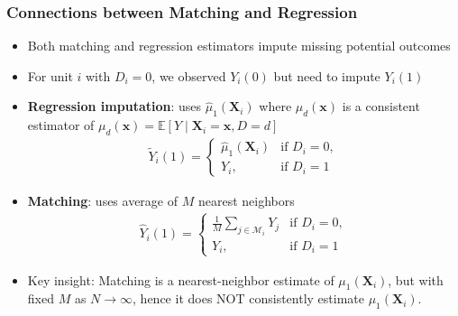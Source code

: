 \documentclass[10pt, handout]{beamer}
\begin{document}
\begin{frame}
  \frametitle{Connections between Matching and Regression}

  \begin{itemize}
    \item Both matching and regression estimators impute missing potential outcomes
    \item For unit $i$ with $D_i = 0$, we observed $Y_i(0)$ but need to impute $Y_i(1)$
    \item \textbf{Regression imputation}: uses $\hat{\mu}_1(\mathbf{X}_i)$ where $\hat{\mu}_d(\mathbf{x})$ is a consistent estimator of $\mu_d(\mathbf{x}) = \mathbb{E}\left[ Y \mid \mathbf{X}_i = \mathbf{x}, D = d \right]$
    \begin{align*}
      \tilde{Y}_i(1) = \begin{cases}
        \hat{\mu}_1(\mathbf{X}_i) & \text{if } D_i = 0, \\
        Y_i, & \text{if } D_i = 1
      \end{cases}
    \end{align*}
    \item \textbf{Matching}: uses average of $M$ nearest neighbors
    \begin{align*}
      \hat{Y}_i(1) = \begin{cases}
        \frac{1}{M} \sum_{j \in \mathcal{M}_i} Y_j & \text{if } D_i = 0, \\
        Y_i, & \text{if } D_i = 1
      \end{cases}
    \end{align*}
    \item Key insight: Matching is a nearest-neighbor estimate of $\mu_1(\mathbf{X}_i)$, but with fixed $M$ as $N \to \infty$, hence it does NOT consistently estimate $\mu_1(\mathbf{X}_i)$.
  \end{itemize}
    
\end{frame}
\end{document}
